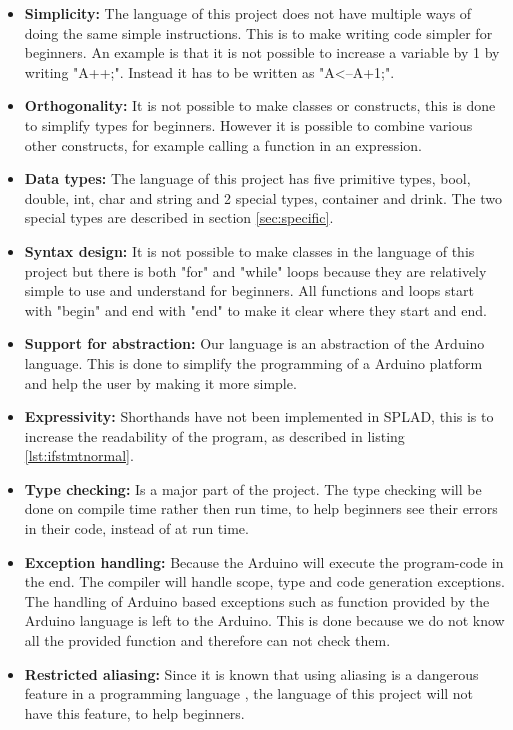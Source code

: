 \begin{itemize}
\item \textbf{Simplicity:} The language of this project does not have multiple ways of doing the same simple instructions. This is to make writing code simpler for beginners. An example is that it is not possible to increase a variable by 1 by writing "A++;". Instead it has to be written as "A<--A+1;".

\item \textbf{Orthogonality:} It is not possible to make classes or constructs, this is done to simplify types for beginners. However it is possible to combine various other constructs, for example calling a function in an expression. 

\item \textbf{Data types:} The language of this project has five primitive types, bool, double, int, char and string and 2 special types, container and drink. The two special types are described in section \ref{sec:specific}.

\item \textbf{Syntax design:} It is not possible to make classes in the language of this project but there is both "for" and "while" loops because they are relatively simple to use and understand for beginners. All functions and loops start with "begin" and end with "end" to make it clear where they start and end.

\item \textbf{Support for abstraction:} Our language is an abstraction of the Arduino language. This is done to simplify the programming of a Arduino platform and help the user by making it more simple.

\item \textbf{Expressivity:} Shorthands have not been implemented in SPLAD, this is to increase the readability of the program, as described in listing \ref{lst:ifstmtnormal}.

\item \textbf{Type checking:} Is a major part of the project. The type checking will be done on compile time rather then run time, to help beginners see their errors in their code, instead of at run time.

\item \textbf{Exception handling:} Because the Arduino will execute the program-code in the end. The compiler will handle scope, type and code generation exceptions. The handling of Arduino based exceptions such as function provided by the Arduino language is left to the Arduino. This is done because we do not know all the provided function and therefore can not check them.

\item \textbf{Restricted aliasing:} Since it is known that using aliasing is a dangerous feature in a programming language  \citep{sebesta}, the language of this project will not have this feature, to help beginners.
\end{itemize}
